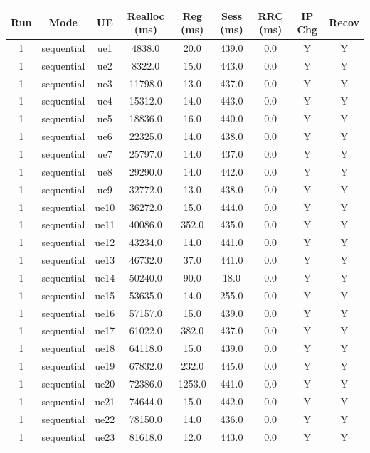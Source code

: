 \begin{table}[ht]
\centering
\begin{tabular}{|c|c|c|c|c|c|c|c|c|}
\hline
Run & Mode & UE & Realloc (ms) & Reg (ms) & Sess (ms) & RRC (ms) & IP Chg & Recov \\
\hline
1 & sequential & ue1 & 4838.0 & 20.0 & 439.0 & 0.0 & Y & Y \\
1 & sequential & ue2 & 8322.0 & 15.0 & 443.0 & 0.0 & Y & Y \\
1 & sequential & ue3 & 11798.0 & 13.0 & 437.0 & 0.0 & Y & Y \\
1 & sequential & ue4 & 15312.0 & 14.0 & 443.0 & 0.0 & Y & Y \\
1 & sequential & ue5 & 18836.0 & 16.0 & 440.0 & 0.0 & Y & Y \\
1 & sequential & ue6 & 22325.0 & 14.0 & 438.0 & 0.0 & Y & Y \\
1 & sequential & ue7 & 25797.0 & 14.0 & 437.0 & 0.0 & Y & Y \\
1 & sequential & ue8 & 29290.0 & 14.0 & 442.0 & 0.0 & Y & Y \\
1 & sequential & ue9 & 32772.0 & 13.0 & 438.0 & 0.0 & Y & Y \\
1 & sequential & ue10 & 36272.0 & 15.0 & 444.0 & 0.0 & Y & Y \\
1 & sequential & ue11 & 40086.0 & 352.0 & 435.0 & 0.0 & Y & Y \\
1 & sequential & ue12 & 43234.0 & 14.0 & 441.0 & 0.0 & Y & Y \\
1 & sequential & ue13 & 46732.0 & 37.0 & 441.0 & 0.0 & Y & Y \\
1 & sequential & ue14 & 50240.0 & 90.0 & 18.0 & 0.0 & Y & Y \\
1 & sequential & ue15 & 53635.0 & 14.0 & 255.0 & 0.0 & Y & Y \\
1 & sequential & ue16 & 57157.0 & 15.0 & 439.0 & 0.0 & Y & Y \\
1 & sequential & ue17 & 61022.0 & 382.0 & 437.0 & 0.0 & Y & Y \\
1 & sequential & ue18 & 64118.0 & 15.0 & 439.0 & 0.0 & Y & Y \\
1 & sequential & ue19 & 67832.0 & 232.0 & 445.0 & 0.0 & Y & Y \\
1 & sequential & ue20 & 72386.0 & 1253.0 & 441.0 & 0.0 & Y & Y \\
1 & sequential & ue21 & 74644.0 & 15.0 & 442.0 & 0.0 & Y & Y \\
1 & sequential & ue22 & 78150.0 & 14.0 & 436.0 & 0.0 & Y & Y \\
1 & sequential & ue23 & 81618.0 & 12.0 & 443.0 & 0.0 & Y & Y \\

\end{tabular}
\end{table}
